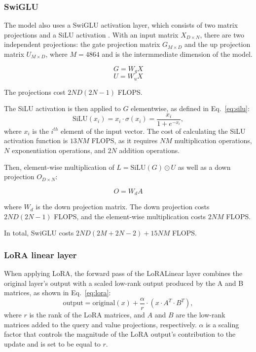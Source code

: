 \documentclass[11pt,a4paper]{article}
\begin{document}
\subsubsection{SwiGLU}
The model also uses a SwiGLU activation layer, which consists of two matrix projections and a SiLU activation \citep{shazeer2020gluvariantsimprovetransformer}. With an input matrix $X_{D \times N}$, there are two independent projections: the gate projection matrix $G_{M \times D}$ and the up projection matrix $U_{M \times D}$, where $M=4864$ and is the intermmediate dimension of the model.

\begin{equation}
    G = W_g X
\end{equation}
\begin{equation}
    U = W_u X
\end{equation}

The projections cost $2ND(2N-1)$ FLOPS.

The SiLU activation is then applied to $G$ elementwise, as defined in Eq.~\ref{eq:silu}:
\begin{equation}
    \mathrm{SiLU}(x_i) = x_i \cdot \sigma(x_i) = \frac{x_i}{1 + e^{-x_i}},
    \label{eq:silu}
\end{equation}
where $x_i$ is the $i^{th}$ element of the input vector. The cost of calculating the SiLU activation function is $13NM$ FLOPS, as it requires $NM$ multiplication operations, $N$ exponentiation operations, and $2N$ addition operations. 

Then, element-wise multiplication of $L = \mathrm{SiLU}(G) \odot U$ as well as a down projection $O_{D \times N}$:

\begin{equation}
    O = W_d A
\end{equation}

where $W_d$ is the down projection matrix. The down projection costs $2ND(2N-1)$ FLOPS, and the element-wise multiplication costs $2NM$ FLOPS.

In total, SwiGLU costs $2ND(2M + 2N -2) + 15NM$ FLOPS.

\subsubsection{LoRA linear layer}
When applying LoRA, the forward pass of the LoRALinear layer combines the original layer's output with a scaled low-rank output produced by the A and B matrices, as shown in Eq.~\ref{eq:lora}:
\begin{equation}
    \mathrm{output} = \mathrm{original}(x) + \frac{\alpha}{r} \cdot (x \cdot A^T \cdot B^T),
    \label{eq:lora}
\end{equation}
where $r$ is the rank of the LoRA matrices, and $A$ and $B$ are the low-rank matrices added to the query and value projections, respectively. $\alpha$ is a scaling factor that controls the magnitude of the LoRA output's contribution to the update and is set to be equal to $r$.
\end{document}
